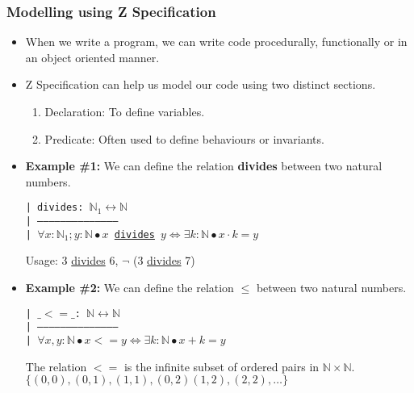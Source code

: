 \documentclass[aspectratio=169]{beamer}
\begin{document}
\begin{frame}[fragile]
\frametitle{Modelling using Z Specification}
\begin{itemize}
\item When we write a program, we can write code procedurally, functionally or in an object oriented manner.
\item Z Specification can help us model our code using two distinct sections.
\begin{enumerate}
    \item Declaration: To define variables.
    \item Predicate: Often used to define behaviours or invariants.
\end{enumerate}
\item \textbf{Example \#1:} We can define the relation \textbf{divides} between two natural numbers.

\texttt{| divides: $\mathbb{N}_1 \leftrightarrow \mathbb{N}$ \\
| ----------------------------------------- \\
| $\forall x : \mathbb{N}_1; y: \mathbb{N} \bullet x$ \underline{divides} $y \Leftrightarrow \exists k : \mathbb{N} \bullet x \cdot k = y$}

Usage: 3 \underline{divides} 6, $\lnot$ (3 \underline{divides} 7)

\item \textbf{Example \#2:} We can define the relation $\leq$ between two natural numbers.

\texttt{| $\_<=\_$: $\mathbb{N} \leftrightarrow \mathbb{N}$ \\
| ----------------------------------------- \\
| $\forall x, y: \mathbb{N} \bullet x <= y \Leftrightarrow \exists k : \mathbb{N} \bullet x + k = y$}

The relation $<=$ is the infinite subset of ordered pairs in $\mathbb{N}\times\mathbb{N}$.
\\$\{(0, 0), (0, 1), (1, 1), (0, 2) (1, 2), (2, 2), \ldots \}$
\end{itemize}
\end{frame}
\end{document}
